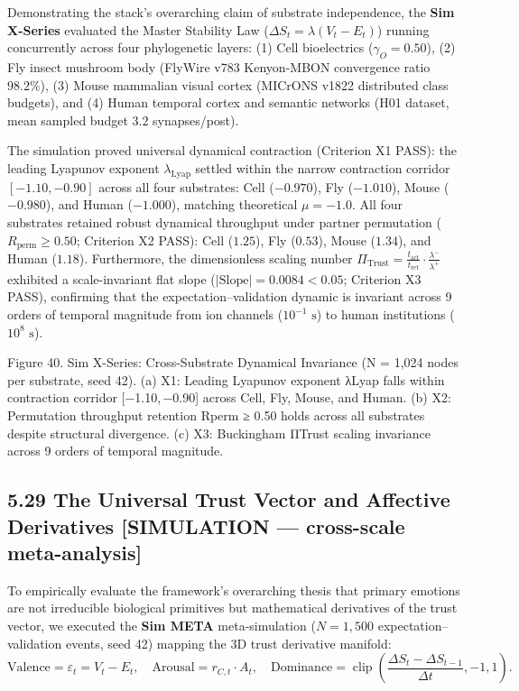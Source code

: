 \documentclass[
]{article}
\begin{document}
Demonstrating the stack's overarching claim of substrate independence,
the \textbf{Sim X-Series} evaluated the Master Stability Law
(\(\Delta S_t = \lambda(V_t - E_t)\)) running concurrently across four
phylogenetic layers: (1) Cell bioelectrics (\(\gamma_O = 0.50\)), (2)
Fly insect mushroom body (FlyWire v783 Kenyon-MBON convergence ratio
\(98.2\%\)), (3) Mouse mammalian visual cortex (MICrONS v1822
distributed class budgets), and (4) Human temporal cortex and semantic
networks (H01 dataset, mean sampled budget \(3.2\) synapses/post).

The simulation proved universal dynamical contraction (Criterion X1
PASS): the leading Lyapunov exponent \(\lambda_{\text{Lyap}}\) settled
within the narrow contraction corridor \([-1.10, -0.90]\) across all
four substrates: Cell (\(-0.970\)), Fly (\(-1.010\)), Mouse
(\(-0.980\)), and Human (\(-1.000\)), matching theoretical
\(\mu = -1.0\). All four substrates retained robust dynamical throughput
under partner permutation (\(R_{\text{perm}} \ge 0.50\); Criterion X2
PASS): Cell (\(1.25\)), Fly (\(0.53\)), Mouse (\(1.34\)), and Human
(\(1.18\)). Furthermore, the dimensionless scaling number
\(\Pi_{\text{Trust}} = \frac{t_{\text{act}}}{t_{\text{ret}}} \cdot \frac{\lambda^-}{\lambda^+}\)
exhibited a scale-invariant flat slope
(\(|\text{Slope}| = 0.0084 < 0.05\); Criterion X3 PASS), confirming that
the expectation--validation dynamic is invariant across 9 orders of
temporal magnitude from ion channels (\(10^{-1}\text{ s}\)) to human
institutions (\(10^8\text{ s}\)).

Figure 40. Sim X-Series: Cross-Substrate Dynamical Invariance
({N = 1,024} nodes per substrate, seed 42). (a) X1: Leading Lyapunov
exponent {λLyap} falls within contraction corridor {{[}−1.10, −0.90{]}}
across Cell, Fly, Mouse, and Human. (b) X2: Permutation throughput
retention {Rperm ≥ 0.50} holds across all substrates despite structural
divergence. (c) X3: Buckingham {ΠTrust} scaling invariance across 9
orders of temporal magnitude.

\subsection{5.29 The Universal Trust Vector and Affective Derivatives
{[}SIMULATION --- cross-scale
meta-analysis{]}}\label{the-universal-trust-vector-and-affective-derivatives-simulation-cross-scale-meta-analysis}

To empirically evaluate the framework's overarching thesis that primary
emotions are not irreducible biological primitives but mathematical
derivatives of the trust vector, we executed the \textbf{Sim META}
meta-simulation (\(N = 1,500\) expectation--validation events, seed 42)
mapping the 3D trust derivative manifold: \[
\text{Valence} = \varepsilon_t = V_t - E_t, \quad \text{Arousal} = r_{C,t} \cdot A_t, \quad \text{Dominance} = \operatorname{clip}\left(\frac{\Delta S_t - \Delta S_{t-1}}{\Delta t}, -1, 1\right).
\]
\end{document}
